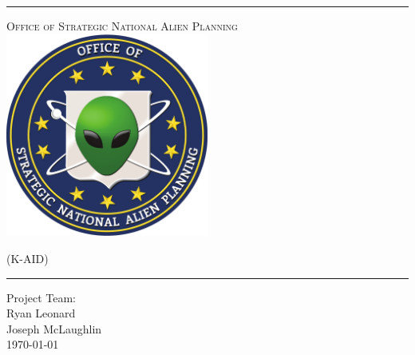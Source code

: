 \begin{titlepage}
\begin{center}

\rule{\linewidth}{0.5mm}

\textsc{\large Office of Strategic National Alien Planning}
~\\[1cm]
\includegraphics[width=0.5\textwidth]{./osnap_logo.pdf}~\\[1cm]


{\Huge \linespread{2}}

\vspace{10pt}

\textsc{\Large (K-AID)}

\rule{\linewidth}{0.5mm}

\vfill

Project Team:\\
Ryan Leonard\\
Joseph McLaughlin\\

\vfill
{\large \today}

\end{center}
\end{titlepage}
